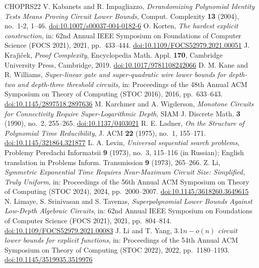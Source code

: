 \documentclass[11pt,reqno]{amsart}
\numberwithin{equation}{section}
\theoremstyle{plain}
\theoremstyle{definition}
\theoremstyle{remark}
\begin{document}
\begin{thebibliography}{CHOPRS22}
 V. Kabanets and R. Impagliazzo, \emph{Derandomizing Polynomial Identity Tests Means Proving Circuit Lower Bounds}, Comput. Complexity \textbf{13} (2004), no.~1-2, 1--46. \href{https://doi.org/10.1007/s00037-004-0182-6}{doi:10.1007/s00037-004-0182-6}
 O. Korten, \emph{The hardest explicit construction}, in: 62nd Annual IEEE Symposium on Foundations of Computer Science (FOCS 2021), 2021, pp.~433--444. \href{https://doi.org/10.1109/FOCS52979.2021.00051}{doi:10.1109/FOCS52979.2021.00051}
 J. Kraj{\'\i}{\v c}ek, \emph{Proof Complexity}, Encyclopedia Math. Appl. \textbf{170}, Cambridge University Press, Cambridge, 2019. \href{https://doi.org/10.1017/9781108242066}{doi:10.1017/9781108242066}
 D. M. Kane and R. Williams, \emph{Super-linear gate and super-quadratic wire lower bounds for depth-two and depth-three threshold circuits}, in: Proceedings of the 48th Annual ACM Symposium on Theory of Computing (STOC 2016), 2016, pp.~633--643. \href{https://doi.org/10.1145/2897518.2897636}{doi:10.1145/2897518.2897636}
 M. Karchmer and A. Wigderson, \emph{Monotone Circuits for Connectivity Require Super-Logarithmic Depth}, SIAM J. Discrete Math. \textbf{3} (1990), no.~2, 255--265. \href{https://doi.org/10.1137/0403021}{doi:10.1137/0403021}
 R. E. Ladner, \emph{On the Structure of Polynomial Time Reducibility}, J. ACM \textbf{22} (1975), no.~1, 155--171. \href{https://doi.org/10.1145/321864.321877}{doi:10.1145/321864.321877}
 L. A. Levin, \emph{Universal sequential search problems}, Problemy Peredachi Informatsii \textbf{9} (1973), no.~3, 115--116 (in Russian); English translation in Problems Inform. Transmission \textbf{9} (1973), 265--266.
 Z. Li, \emph{Symmetric Exponential Time Requires Near-Maximum Circuit Size: Simplified, Truly Uniform}, in: Proceedings of the 56th Annual ACM Symposium on Theory of Computing (STOC 2024), 2024, pp.~2000--2007. \href{https://doi.org/10.1145/3618260.3649615}{doi:10.1145/3618260.3649615}
 N. Limaye, S. Srinivasan and S. Tavenas, \emph{Superpolynomial Lower Bounds Against Low-Depth Algebraic Circuits}, in: 62nd Annual IEEE Symposium on Foundations of Computer Science (FOCS 2021), 2021, pp.~804--814. \href{https://doi.org/10.1109/FOCS52979.2021.00083}{doi:10.1109/FOCS52979.2021.00083}
 J. Li and T. Yang, \emph{$3.1n-o(n)$ circuit lower bounds for explicit functions}, in: Proceedings of the 54th Annual ACM Symposium on Theory of Computing (STOC 2022), 2022, pp.~1180--1193. \href{https://doi.org/10.1145/3519935.3519976}{doi:10.1145/3519935.3519976}

\end{thebibliography}
\end{document}
